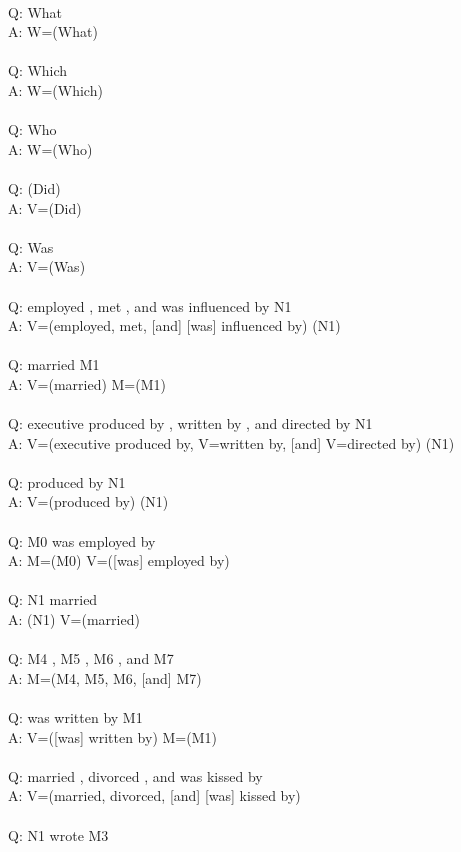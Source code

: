 \documentclass{article} \usepackage{iclr2022_conference,times}
\newcommand{\prompt}[1]{{\footnotesize \textsf{#1}}}
\begin{document}
\prompt{\\
Q: What \\
A: W=(What) \\
 \\
Q: Which \\
A: W=(Which) \\
 \\
Q: Who \\
A: W=(Who) \\
 \\
Q: (Did) \\
A: V=(Did) \\
 \\
Q: Was \\
A: V=(Was) \\
 \\
Q: employed , met , and was influenced by N1 \\
A: V=(employed, met, [and] [was] influenced by) (N1) \\
 \\
Q: married M1 \\
A: V=(married) M=(M1) \\
 \\
Q: executive produced by , written by , and directed by N1 \\
A: V=(executive produced by, V=written by, [and] V=directed by) (N1) \\
 \\
Q: produced by N1 \\
A: V=(produced by) (N1) \\
 \\
Q: M0 was employed by \\
A: M=(M0) V=([was] employed by) \\
 \\
Q: N1 married \\
A: (N1) V=(married) \\
 \\
Q: M4 , M5 , M6 , and M7 \\
A: M=(M4, M5, M6, [and] M7) \\
 \\
Q: was written by M1 \\
A: V=([was] written by) M=(M1) \\
 \\
Q: married , divorced , and was kissed by \\
A: V=(married, divorced, [and] [was] kissed by) \\
 \\
Q: N1 wrote M3 \\
}
\end{document}
